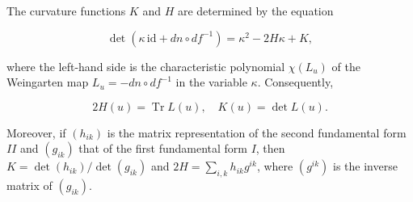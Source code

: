 The curvature functions $K$ and $H$ are determined by the equation

$$\det(\kappa \, \mathrm{id} + dn \circ df^{-1}) = \kappa^2 - 2H\kappa + K,$$

where the left-hand side is the characteristic polynomial $\chi(L_u)$ of the Weingarten map $L_u = -dn \circ df^{-1}$ in the variable $\kappa$. Consequently,

$$2H(u) = \operatorname{Tr} L(u), \quad K(u) = \det L(u).$$

Moreover, if $(h_{ik})$ is the matrix representation of the second fundamental form $II$ and $(g_{ik})$ that of the first fundamental form $I$, then $K = \det(h_{ik}) / \det(g_{ik})$ and $2H = \sum_{i,k} h_{ik} g^{ik}$, where $(g^{ik})$ is the inverse matrix of $(g_{ik})$.
